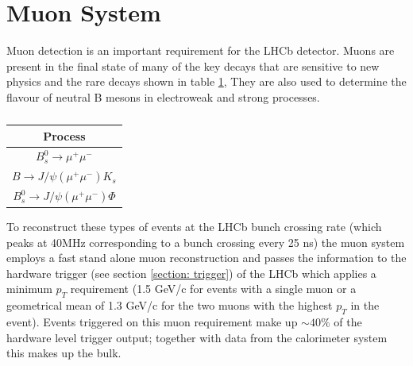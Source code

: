 \section{Muon System}

Muon detection is an important requirement for the LHCb detector. Muons are present in the final state of many of the key decays that are sensitive to new physics and the rare decays shown in table \ref{table: Muon decays}, They are also used to determine the flavour of neutral B mesons in electroweak and strong processes.%


% 
% 
% 

\begin{table}[htdp]
	\caption{}
	\begin{center}
		\begin{tabular}{|c|}
			\hline
			Process \\ 
			\hline
			$B_s^0 \rightarrow \mu^+ \mu^-$ \\
			$B \rightarrow J/\psi(\mu^+\mu^-)K_s$ \\ 
			$B_s^0 \rightarrow J/\psi(\mu^+\mu^-)\Phi$ \\
			\hline
		\end{tabular}
	\end{center}
	\label{table: Muon decays}
\end{table}%

To reconstruct these types of events at the LHCb bunch crossing rate (which peaks at 40MHz corresponding to a bunch crossing every 25 ns) the muon system employs a fast stand alone muon reconstruction and passes the information to the hardware trigger (see section \ref{section: trigger}) of the LHCb which applies a minimum $p_T$ requirement (1.5 GeV/c for events with a single muon or a geometrical mean of 1.3 GeV/c for the two muons with the highest $p_T$ in the event). Events triggered on this muon requirement make up $\sim40\%$ of the hardware level trigger output; together with data from the calorimeter system this makes up the bulk.

